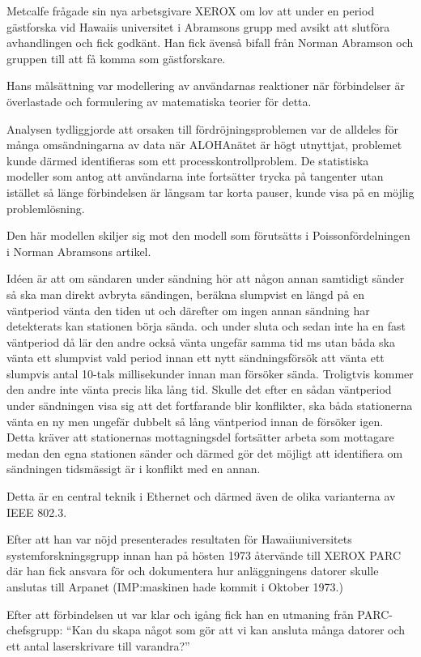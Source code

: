 \documentclass[swedish,10pt,a4paper]{report}
\begin{document}
Metcalfe frågade sin nya arbetsgivare XEROX om lov att under en period
gästforska vid Hawaiis universitet i Abramsons grupp med avsikt att slutföra avhandlingen
och fick godkänt.
Han fick ävenså bifall från Norman Abramson och gruppen till
att få komma som gästforskare.

Hans målsättning var modellering av användarnas reaktioner när förbindelser är överlastade
och formulering av matematiska teorier för detta.

Analysen tydliggjorde att orsaken till fördröjningsproblemen var de alldeles för många omsändningarna av
data när ALOHAnätet är högt utnyttjat, problemet kunde därmed identifieras som ett processkontrollproblem.
De statistiska modeller som antog att användarna inte fortsätter trycka på tangenter utan istället
så länge förbindelsen är långsam tar korta pauser, kunde visa på en möjlig problemlösning.

Den här modellen skiljer sig mot den modell som förutsätts i Poissonfördelningen
i Norman Abramsons artikel.

Idéen är att om sändaren under sändning hör att någon annan samtidigt sänder så ska man
direkt avbryta sändingen, beräkna slumpvist en längd på en väntperiod vänta den tiden ut
och därefter om ingen annan sändning har detekterats kan stationen börja sända.
och under
sluta och sedan inte ha en fast väntperiod då lär den andre också vänta ungefär samma tid ms utan
båda ska vänta ett slumpvist vald period innan ett nytt sändningsförsök
att vänta ett slumpvis antal 10-tals millisekunder innan man försöker sända. Troligtvis kommer
den andre inte vänta precis lika lång tid. Skulle det efter en sådan väntperiod under sändningen
visa sig att det fortfarande blir konflikter, ska båda stationerna vänta en ny men ungefär dubbelt så lång
väntperiod innan de försöker igen. Detta kräver att stationernas mottagningsdel fortsätter arbeta som
mottagare medan den egna stationen sänder och därmed gör det möjligt att identifiera om sändningen
tidsmässigt är i konflikt med en annan.

Detta är en central teknik i Ethernet och därmed även de olika varianterna av IEEE 802.3.

Efter att han var nöjd presenterades resultaten för Hawaiiuniversitets systemforskningsgrupp innan
han på hösten 1973 återvände till XEROX PARC där han fick ansvara för och dokumentera
hur anläggningens datorer skulle anslutas till Arpanet (IMP:maskinen hade kommit i Oktober 1973.)

Efter att förbindelsen ut var klar och igång fick han en utmaning från PARC-chefsgrupp:
\foreignquote{english}{Kan du skapa något som gör att vi kan ansluta många datorer och ett antal laserskrivare till varandra?}
\end{document}
